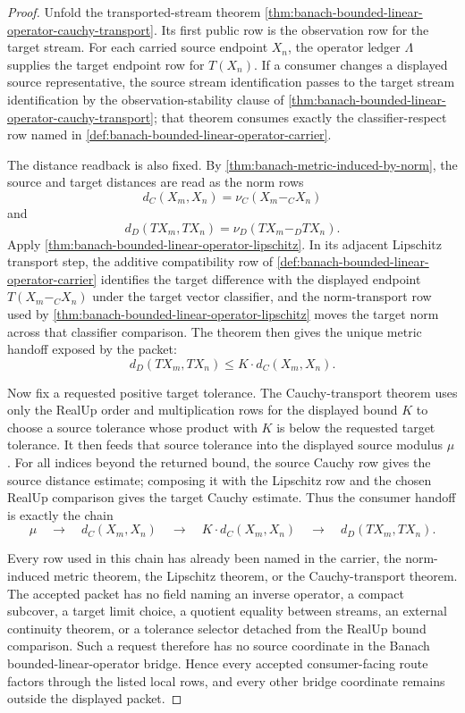 \begin{proof}
Unfold the transported-stream theorem
\autoref{thm:banach-bounded-linear-operator-cauchy-transport}. Its first public
row is the observation row for the target stream. For each carried source
endpoint $X_n$, the operator ledger $\Lambda$ supplies the target endpoint row
for $T(X_n)$. If a consumer changes a displayed source representative, the
source stream identification passes to the target stream identification by the
observation-stability clause of
\autoref{thm:banach-bounded-linear-operator-cauchy-transport}; that theorem
consumes exactly the classifier-respect row named in
\autoref{def:banach-bounded-linear-operator-carrier}.

The distance readback is also fixed. By
\autoref{thm:banach-metric-induced-by-norm}, the source and target distances
are read as the norm rows
$$
d_C(X_m,X_n)=\nu_C(X_m-_C X_n)
$$
and
$$
d_D(TX_m,TX_n)=\nu_D(TX_m-_D TX_n).
$$
Apply \autoref{thm:banach-bounded-linear-operator-lipschitz}. In its adjacent
Lipschitz transport step, the additive compatibility row of
\autoref{def:banach-bounded-linear-operator-carrier} identifies the target
difference with the displayed endpoint $T(X_m-_C X_n)$ under the target vector
classifier, and the norm-transport row used by
\autoref{thm:banach-bounded-linear-operator-lipschitz} moves the target norm
across that classifier comparison. The theorem then gives the unique metric
handoff exposed by the packet:
$$
d_D(TX_m,TX_n)\le K\cdot d_C(X_m,X_n).
$$

Now fix a requested positive target tolerance. The Cauchy-transport theorem
uses only the RealUp order and multiplication rows for the displayed bound
$K$ to choose a source tolerance whose product with $K$ is below the requested
target tolerance. It then feeds that source tolerance into the displayed source
modulus $\mu$. For all indices beyond the returned bound, the source Cauchy
row gives the source distance estimate; composing it with the Lipschitz row
and the chosen RealUp comparison gives the target Cauchy estimate. Thus the
consumer handoff is exactly the chain
$$
\mu
\quad\longrightarrow\quad
 d_C(X_m,X_n)
\quad\longrightarrow\quad
 K\cdot d_C(X_m,X_n)
\quad\longrightarrow\quad
 d_D(TX_m,TX_n).
$$

Every row used in this chain has already been named in the carrier, the
norm-induced metric theorem, the Lipschitz theorem, or the Cauchy-transport
theorem. The accepted packet has no field naming an inverse operator, a compact
subcover, a target limit choice, a quotient equality between streams, an
external continuity theorem, or a tolerance selector detached from the RealUp
bound comparison. Such a request therefore has no source coordinate in the
Banach bounded-linear-operator bridge. Hence every accepted consumer-facing
route factors through the listed local rows, and every other bridge coordinate
remains outside the displayed packet.
\end{proof}
